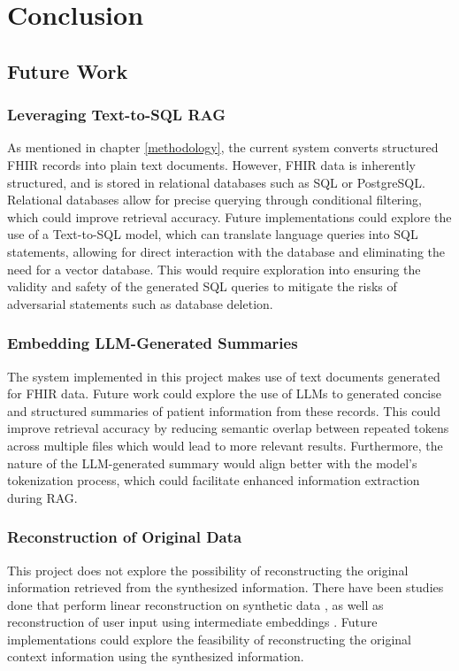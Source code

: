 \chapter{Conclusion} \label{conclusion}

\section{Future Work}

\subsection{Leveraging Text-to-SQL RAG}
As mentioned in chapter \ref{methodology}, the current system converts structured FHIR records into plain text documents. However, FHIR data is inherently structured, and is stored in relational databases such as SQL or PostgreSQL. Relational databases allow for precise querying through conditional filtering, which could improve retrieval accuracy. Future implementations could explore the use of a Text-to-SQL model, which can translate language queries into SQL statements, allowing for direct interaction with the database and eliminating the need for a vector database. This would require exploration into ensuring the validity and safety of the generated SQL queries to mitigate the risks of adversarial statements such as database deletion.

\subsection{Embedding LLM-Generated Summaries}
The system implemented in this project makes use of text documents generated for FHIR data.
Future work could explore the use of LLMs to generated concise and structured summaries of patient information from these records.
This could improve retrieval accuracy by reducing semantic overlap between repeated tokens across multiple files which would lead to more relevant results.
Furthermore, the nature of the LLM-generated summary would align better with the model's tokenization process, which could facilitate enhanced information extraction during RAG.

\subsection{Reconstruction of Original Data}
This project does not explore the possibility of reconstructing the original information retrieved from the synthesized information. There have been studies done that perform linear reconstruction on synthetic data \autocite{annamalai2024linearreconstructionapproachattribute}, as well as reconstruction of user input using intermediate embeddings \autocite{zheng2023inputreconstructionattackvertical}. Future implementations could explore the feasibility of reconstructing the original context information using the synthesized information.
